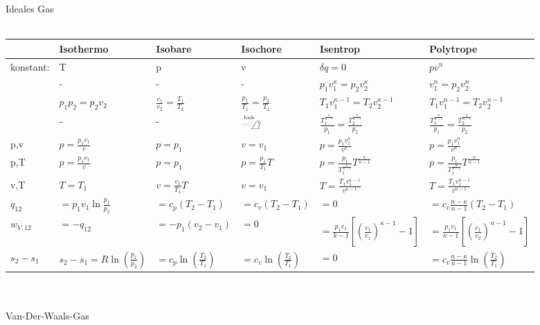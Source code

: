 \documentclass[twocolumn]{article}
\begin{document}
\onecolumn
\begin{landscape}
	\LARGE
	Ideales Gas \\\\
	\renewcommand{\arraystretch}{2}
\begin{tabular}{l|l|l|l|l|l}
	 & Isothermo  & Isobare  & Isochore  & Isentrop  & Polytrope \\ \hline
	konstant:  & T  & p  & v  & $\delta q=0$  & $pv^n$  \\ \hline
	& -  & -  & -  & $p_1 v_1^{\kappa} = p_2 v_2^{\kappa}$  & $v_1^{n} = p_2 v_2^{n}$  \\ \hline
& $p_1 p_2 = p_2 v_2$  & $\frac{v_1}{v_2} = \frac{T_1}{T_2}$  & $\frac{p_1}{T_1} = \frac{p_2}{T_2}$  & $T_1 v_1^{\kappa - 1} = T_2 v_2^{\kappa -1}$   & $T_1 v_1^{n - 1} = T_2 v_2^{n -1}$  \\ \hline
	& -  & -  & $\xrightswishingghost{\text{\tiny buh}}$  & $\frac{T_1^{\frac{\kappa}{\kappa -1}}}{p_1} = \frac{T_2^{\frac{\kappa}{\kappa -1}}}{p_2}$  & $\frac{T_1^{\frac{n}{n -1}}}{p_1} = \frac{T_2^{\frac{n}{n -1}}}{p_2}$  \\ \hline
p,v & $p = \frac{p_1 v_1}{v}$  & $p = p_1$  & $v = v_1$  & $p = \frac{p_1 v_1^{\kappa}}{v^{\kappa}}$  &  $p = \frac{p_1 v_1^{n}}{v^{n}}$ \\ \hline
p,T & $p = \frac{p_1 v_1}{v}$  & $p = p_1$  & $p = \frac{p_1}{T_1}T$  & $p = \frac{p_1}{T_1^{\frac{\kappa}{\kappa -1}}} T^{\frac{\kappa}{\kappa -1}}$  &  $p = \frac{p_1}{T_1^{\frac{n}{n -1}}} T^{\frac{n}{n -1}}$\\ \hline
v,T  & $T = T_1$  & $v = \frac{v_1}{T_1}T$  & $v = v_1 $ & $T = \frac{T_1 v_1^{\kappa - 1}}{v^{\kappa - 1}}$  & $T = \frac{T_1v_1^{n-1}}{v^{n-1}}  $\\ \hline
	$q_{12}$	& $= p_1v_1 \ln \frac{p_1}{p_2}$  & $= c_p(T_2 - T_1)$   & $= c_v(T_2 - T_1)$  & $= 0$   &  $= c_v \frac{n-\kappa}{n-1}(T_2-T_1)$ \\ \hline
	$w_{V,12}$  & $= -q_{12}$ & $= -p_1(v_2 - v_1)$  & $= 0$  & $= \frac{p_1 v_1}{k - 1}\left[\left(\frac{v_1}{v_1}\right)^{\kappa - 1} - 1\right]$  & $= \frac{p_1 v_1}{n - 1}\left[\left(\frac{v_1}{v_2}\right)^{n-1} - 1\right]$ \\ \hline
	$s_2 - s_1$ & $s_2 -s_1 = R \ln \left(\frac{p_1}{p_2}\right)$  & $= c_p \ln \left(\frac{T_2}{T_1}\right)$  & $= c_v \ln \left(\frac{T_2}{T_1}\right)$  & $= 0$  & $= c_v \frac{n - \kappa }{n - 1} \ln \left(\frac{T_2}{T_1}\right)$  \\ 
\end{tabular}
\bigskip
\\\\
\large
Van-Der-Waals-Gas  \\


\end{landscape}
\end{document}
